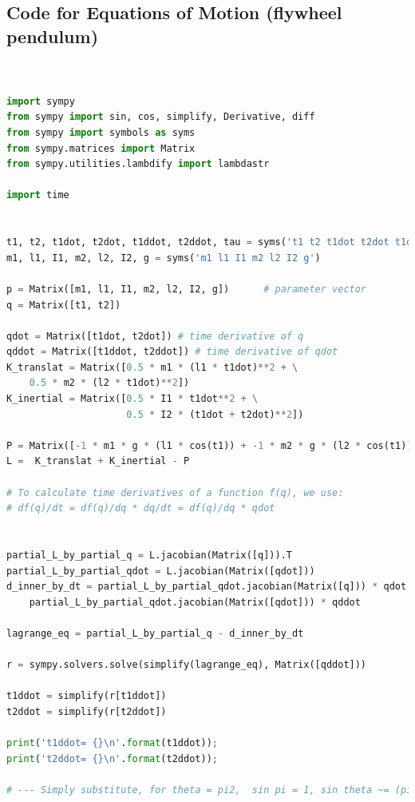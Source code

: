 \documentclass[conference]{IEEEtran}
\begin{document}
\subsection{Code for Equations of Motion (flywheel pendulum)}

\lstset{basicstyle=\footnotesize\ttfamily,breaklines=true}
\begin{lstlisting}[language=Python,frame=single]  % Start your code-block


import sympy
from sympy import sin, cos, simplify, Derivative, diff
from sympy import symbols as syms
from sympy.matrices import Matrix
from sympy.utilities.lambdify import lambdastr

import time


t1, t2, t1dot, t2dot, t1ddot, t2ddot, tau = syms('t1 t2 t1dot t2dot t1ddot t2ddot tau')
m1, l1, I1, m2, l2, I2, g = syms('m1 l1 I1 m2 l2 I2 g')

p = Matrix([m1, l1, I1, m2, l2, I2, g])      # parameter vector
q = Matrix([t1, t2])

qdot = Matrix([t1dot, t2dot]) # time derivative of q
qddot = Matrix([t1ddot, t2ddot]) # time derivative of qdot
K_translat = Matrix([0.5 * m1 * (l1 * t1dot)**2 + \
    0.5 * m2 * (l2 * t1dot)**2])
K_inertial = Matrix([0.5 * I1 * t1dot**2 + \
                     0.5 * I2 * (t1dot + t2dot)**2])

P = Matrix([-1 * m1 * g * (l1 * cos(t1)) + -1 * m2 * g * (l2 * cos(t1))])
L =  K_translat + K_inertial - P

# To calculate time derivatives of a function f(q), we use:
# df(q)/dt = df(q)/dq * dq/dt = df(q)/dq * qdot


partial_L_by_partial_q = L.jacobian(Matrix([q])).T
partial_L_by_partial_qdot = L.jacobian(Matrix([qdot]))
d_inner_by_dt = partial_L_by_partial_qdot.jacobian(Matrix([q])) * qdot + \
    partial_L_by_partial_qdot.jacobian(Matrix([qdot])) * qddot

lagrange_eq = partial_L_by_partial_q - d_inner_by_dt

r = sympy.solvers.solve(simplify(lagrange_eq), Matrix([qddot]))

t1ddot = simplify(r[t1ddot])
t2ddot = simplify(r[t2ddot])

print('t1ddot= {}\n'.format(t1ddot));
print('t2ddot= {}\n'.format(t2ddot));

# --- Simply substitute, for theta = pi2,  sin pi = 1, sin theta ~= (pi - theta )

\end{lstlisting}
\end{document}
